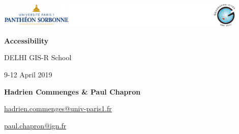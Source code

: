 \graphicspath{{IMAGE/}}


\begin{frame}

\includegraphics[width=12cm]{Logos.pdf}

\vfill

\begin{center}

\vspace*{1.5cm}

\LARGE
\textbf{Accessibility}

\vspace*{1.5cm}
 DELHI GIS-R School


\large
9-12 April 2019

\vspace*{1.5cm}


\textbf{Hadrien Commenges \& Paul Chapron}

{\small

\vspace*{0.1cm}

\url{hadrien.commenges@univ-paris1.fr}

\url{paul.chapron@ign.fr}
}

\end{center}

\end{frame}


